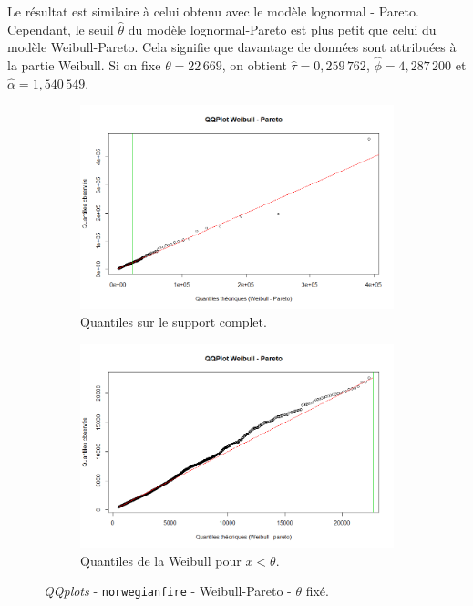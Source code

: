 		Le résultat est similaire à celui obtenu avec le modèle lognormal - Pareto. Cependant, le seuil $\hat{\theta}$ du modèle lognormal-Pareto est plus petit que celui du modèle Weibull-Pareto. Cela signifie que davantage de données sont attribuées à la partie Weibull. Si on fixe $\theta = 22\,669$, on obtient $\hat{\tau} =0,259\,762$, $\hat{\phi}=4,287\,200$ et $\hat{\alpha} = 1,540\,549$.
		
		\begin{figure}[H]
			\begin{center}
				\begin{subfigure}[b]{0.45\textwidth}
					\includegraphics[scale=0.35]{Graphiques/QQ_Wei_pa_choix} 
					\caption{Quantiles sur le support complet.} \label{QQplot_Wei_pa_choix}
				\end{subfigure}
				\begin{subfigure}[b]{0.4\textwidth}
					\includegraphics[scale=0.35]{Graphiques/QQ_Wei_pa_choix_t1} 
					\caption{Quantiles de la Weibull pour $x<\theta$.} \label{QQplot_Wei_pa_choix_2}
				\end{subfigure}
				\renewcommand{\figurename}{Illustration}
				\caption{\textit{QQplots} - \texttt{norwegianfire} - Weibull-Pareto - $\theta$ fixé.}\label{Wei_Pareto_Teta_fixe}
			\end{center}
		\end{figure}
	
